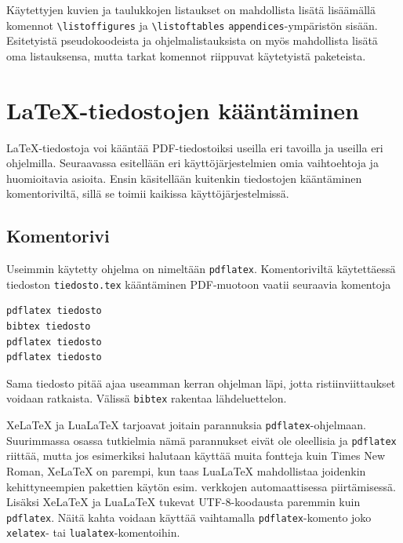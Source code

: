 Käytettyjen kuvien ja taulukkojen listaukset on mahdollista lisätä lisäämällä komennot \verb+\listoffigures+ ja \verb+\listoftables+ \texttt{appendices}-ympäristön sisään. Esitetyistä pseudokoodeista ja ohjelmalistauksista on myös mahdollista lisätä oma listauksensa, mutta tarkat komennot riippuvat käytetyistä paketeista. 

\chapter{\LaTeX-tiedostojen kääntäminen}
\label{cha:latex:tyonkulku}


\LaTeX-tiedostoja voi kääntää PDF-tiedostoiksi useilla eri tavoilla ja useilla eri ohjelmilla. Seuraavassa esitellään eri käyttöjärjestelmien omia vaihtoehtoja ja huomioitavia asioita. Ensin käsitellään kuitenkin tiedostojen kääntäminen komentoriviltä, sillä se toimii kaikissa käyttöjärjestelmissä. 

\section{Komentorivi}
\label{sec:latex:komentorivi}

Useimmin käytetty ohjelma on nimeltään \texttt{pdflatex}. Komentoriviltä käytettäessä tiedoston \texttt{tiedosto.tex} kääntäminen PDF-muotoon vaatii seuraavia komentoja
\begin{lstlisting}[style=cmdline]
pdflatex tiedosto
bibtex tiedosto
pdflatex tiedosto
pdflatex tiedosto
\end{lstlisting}
Sama tiedosto pitää ajaa useamman kerran ohjelman läpi, jotta ristiinviittaukset voidaan ratkaista. Välissä \texttt{bibtex} rakentaa lähdeluettelon.

XeLaTeX ja LuaLaTeX tarjoavat joitain parannuksia \texttt{pdflatex}-ohjelmaan. Suurimmassa osassa tutkielmia nämä parannukset eivät ole oleellisia ja \texttt{pdflatex} riittää, mutta jos esimerkiksi halutaan käyttää muita fontteja kuin Times New Roman, XeLaTeX on parempi, kun taas LuaLaTeX mahdollistaa joidenkin kehittyneempien pakettien käytön esim. verkkojen automaattisessa piirtämisessä. Lisäksi XeLaTeX ja LuaLaTeX tukevat UTF-8-koodausta paremmin kuin \texttt{pdflatex}. Näitä kahta voidaan käyttää vaihtamalla \texttt{pdflatex}-komento joko \texttt{xelatex}- tai \texttt{lualatex}-komentoihin.

